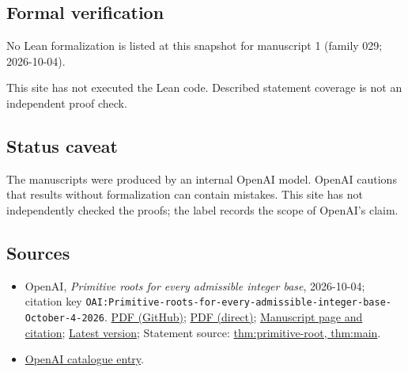 \documentclass[11pt]{article}
\begin{document}
\subsection{Formal verification}
No Lean formalization is listed at this snapshot for manuscript 1 (family 029; 2026-10-04).

This site has not executed the Lean code. Described statement coverage is not an independent proof check.

\subsection{Status caveat}
The manuscripts were produced by an internal OpenAI model. OpenAI cautions that results without formalization can contain mistakes. This site has not independently checked the proofs; the label records the scope of OpenAI's claim.

\subsection{Sources}
\begin{itemize}
\item OpenAI, \emph{Primitive roots for every admissible integer base}, 2026-10-04; citation key \texttt{OAI:Primitive-roots-for-every-admissible-integer-base-October-4-2026}. \href{https://github.com/openai/math/blob/adc7f1241b42e322a6451854ab7e4b4c146bf78a/preprints/Primitive-roots-for-every-admissible-integer-base-October-4-2026/primitive-roots-all-integer-bases.pdf}{PDF (GitHub)}; \href{https://github.com/openai/math/raw/adc7f1241b42e322a6451854ab7e4b4c146bf78a/preprints/Primitive-roots-for-every-admissible-integer-base-October-4-2026/primitive-roots-all-integer-bases.pdf}{PDF (direct)}; \href{https://github.com/openai/math/blob/adc7f1241b42e322a6451854ab7e4b4c146bf78a/preprints/Primitive-roots-for-every-admissible-integer-base-October-4-2026/README.md}{Manuscript page and citation}; \href{https://github.com/openai/math/blob/main/preprints/Primitive-roots-for-every-admissible-integer-base-October-4-2026/primitive-roots-all-integer-bases.pdf}{Latest version}; Statement source: \href{https://github.com/openai/math/blob/adc7f1241b42e322a6451854ab7e4b4c146bf78a/preprints/Primitive-roots-for-every-admissible-integer-base-October-4-2026/build/sections/01-introduction.tex\#L17}{thm:primitive-root, thm:main}.
\item \href{https://github.com/openai/math/blob/adc7f1241b42e322a6451854ab7e4b4c146bf78a/CONTENTS.md}{OpenAI catalogue entry}.
\end{itemize}
\end{document}
